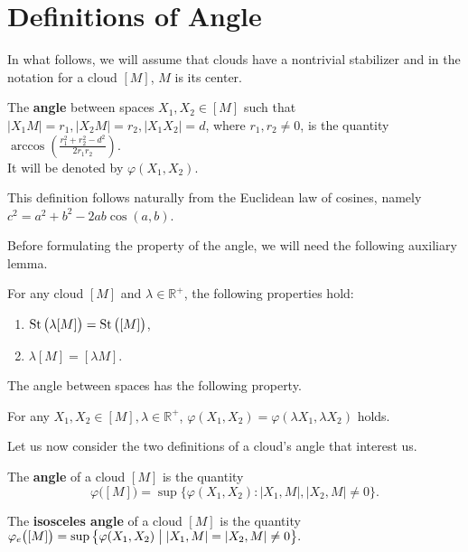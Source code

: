 \documentclass[11pt,twoside
]{article}
\begin{document}
\section{Definitions of Angle}
In what follows, we will assume that clouds have a nontrivial
stabilizer and in the notation for a cloud $ [M] $, $ M $ is its center.
\begin{definition}
  The \textbf{angle} between spaces $ X_1, X_2 \in [M] $ such that $
  |X_1 M| = r_1, | X_2 M | =r_2, |X_1 X_2| = d$, where $ r_1, r_2
  \neq 0 $, is the quantity $ \arccos \left(\frac{r_1^2 + r_{2}^2 -
  d^2}{2r_1r_2} \right)$.\\ It will be denoted by $ \varphi(X_1, X_2) $.
\end{definition}
\begin{remark}
  This definition follows naturally from the Euclidean law of
  cosines, namely $ c^{2} = a^2 + b^2 - 2ab\cos (a,b) $.
\end{remark}
Before formulating the property of the angle, we will need the
following auxiliary lemma.
\begin{lemma}
  \label{lem:lambdacloud} For any cloud \( [M] \) and \( \lambda
  \in\mathbb{R}^+ \), the following properties hold{\textup{:}}
  \begin{enumerate}
    \item \( \operatorname{St}\big(\lambda [M]\big) = \operatorname{St}\big([M]\big)\),
      \label{lem:lambdacloud:1}
    \item \( \lambda [M] = [\lambda M] \).\label{lem:lambdacloud:2}
  \end{enumerate}
\end{lemma}
The angle between spaces has the following property.
\begin{lemma}
  \label{lemmaAngleBetweenSpaces} For any \( X_1, X_2 \in [M],
  \lambda \in\mathbb{R}^+ \), \( \varphi (X_1, X_2) = \varphi
  (\lambda X_1, \lambda X_2) \) holds.
\end{lemma}
Let us now consider the two definitions of a cloud's angle that interest us.
\begin{definition}
  The \textbf{angle} of a cloud $ [M] $ is the quantity
  \[
    \varphi \big([M]\big)= \sup \big\{\varphi (X_1, X_2) \colon |
    X_1,M |, |X_2,M| \neq 0\big\}.
  \]
\end{definition}
\begin{definition}
  The \textbf{isosceles angle} of a cloud $ [M] $ is the quantity \(
    \varphi_e \big([M]\big) = \sup \big\{\varphi (X_1, X_2) \bigm|
  |X_1,M | = |X_2,M| \neq 0\big\}. \)
\end{definition}
\end{document}
